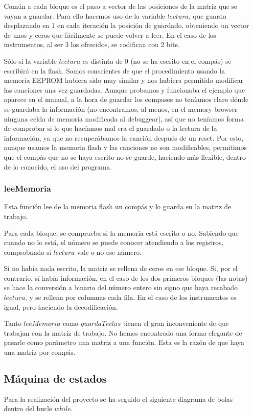 \documentclass[12pt,a4paper]{article}
\begin{document}
Común a cada bloque es el paso a vector de las posiciones de la matriz que se vayan a guardar. Para ello hacemos uso de la variable $lectura$, que guarda desplazando en 1 en cada iteración la posición de guardado, obteniendo un vector de unos y ceros que fácilmente se puede volver a leer. En el caso de los instrumentos, al ser 3 los ofrecidos, se codifican con 2 bits.

Sólo si la variable $lectura$ es distinta de 0 (no se ha escrito en el compás) se escribirá en la flash. Somos conscientes de que el procedimiento usando la memoria EEPROM hubiera sido muy similar y nos hubiera permitido modificar las canciones una vez guardadas. Aunque probamos y funcionaba el ejemplo que aparece en el manual, a la hora de guardar los compases no teníamos claro dónde se guardaba la información (no encontramos, al menos, en el memory browser ninguna celda de memoria modificada al debuggear), así que no teníamos forma de comprobar si lo que hacíamos mal era el guardado o la lectura de la información, ya que no recuperábamos la canción después de un reset. Por esto, aunque usamos la memoria flash y las canciones no son modificables, permitimos que el compás que no se haya escrito no se guarde, haciendo más flexible, dentro de lo conocido, el uso del programa.


\subsubsection{leeMemoria}
Esta función lee de la memoria flash un compás y lo guarda en la matriz de trabajo.

Para cada bloque, se comprueba si la memoria está escrita o no. Sabiendo que cuando no lo está, el número se puede conocer atendiendo a los registros, comprobando si $lectura$ vale o no ese número.

Si no había nada escrito, la matriz se rellena de ceros en ese bloque. Si, por el contrario, sí había información, en el caso de los dos primeros bloques (las notas) se hace la conversión a binario del número entero sin signo que haya recabado $lectura$, y se rellena por columnas cada fila. En el caso de los instrumentos es igual, pero haciendo la decodificación.

Tanto $leeMemoria$ como $guardaTeclas$ tienen el gran inconveniente de que trabajan con la matriz de trabajo. No hemos encontrado una forma elegante de pasarle como parámetro una matriz a una función. Esta es la razón de que haya una matriz por compás.


\subsection{Máquina de estados}
Para la realización del proyecto se ha seguido el siguiente diagrama de bolas dentro del bucle $while$.
\end{document}
